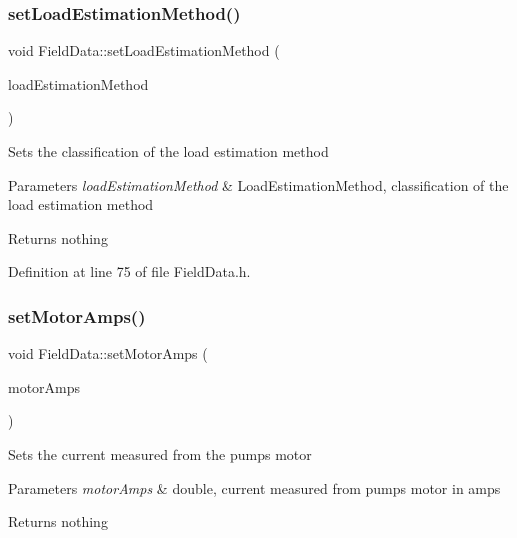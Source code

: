 \subsubsection{\texorpdfstring{set\+Load\+Estimation\+Method()}{setLoadEstimationMethod()}\hspace{0.1cm}{\footnotesize\ttfamily [3/3]}}
{\footnotesize\ttfamily void Field\+Data\+::set\+Load\+Estimation\+Method (\begin{DoxyParamCaption}\item[{\hyperlink{class_field_data_a424e89914ba5684c01bb269dbe3312fd}{Load\+Estimation\+Method}}]{load\+Estimation\+Method }\end{DoxyParamCaption})\hspace{0.3cm}{\ttfamily [inline]}}

Sets the classification of the load estimation method


\begin{DoxyParams}{Parameters}
{\em load\+Estimation\+Method} & Load\+Estimation\+Method, classification of the load estimation method\\
\hline
\end{DoxyParams}
\begin{DoxyReturn}{Returns}
nothing 
\end{DoxyReturn}


Definition at line 75 of file Field\+Data.\+h.

\mbox{\label{class_field_data_a4f9373e8a215853b08bbe6a1915fb1a9}} 
\subsubsection{\texorpdfstring{set\+Motor\+Amps()}{setMotorAmps()}\hspace{0.1cm}{\footnotesize\ttfamily [1/3]}}
{\footnotesize\ttfamily void Field\+Data\+::set\+Motor\+Amps (\begin{DoxyParamCaption}\item[{double}]{motor\+Amps }\end{DoxyParamCaption})\hspace{0.3cm}{\ttfamily [inline]}}

Sets the current measured from the pump\textquotesingle{}s motor


\begin{DoxyParams}{Parameters}
{\em motor\+Amps} & double, current measured from pump\textquotesingle{}s motor in amps\\
\hline
\end{DoxyParams}
\begin{DoxyReturn}{Returns}
nothing 
\end{DoxyReturn}



